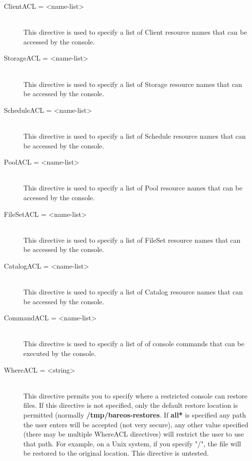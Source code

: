 \begin{description}
\item [ClientACL = {\textless}name-list{\textgreater}] \hfill \\
This directive is used to  specify a list of Client resource names that can
be
accessed by  the console.

\item [StorageACL = {\textless}name-list{\textgreater}] \hfill \\
This directive is used to  specify a list of Storage resource names that can
be accessed by  the console.

\item [ScheduleACL = {\textless}name-list{\textgreater}] \hfill \\
This directive is used to  specify a list of Schedule resource names that can
be accessed by the console.

\item [PoolACL = {\textless}name-list{\textgreater}] \hfill \\
This directive is used to  specify a list of Pool resource names that can be
accessed by the console.

\item [FileSetACL = {\textless}name-list{\textgreater}] \hfill \\
This directive is used to specify a list of FileSet resource names that
can be accessed by the console.

\item [CatalogACL = {\textless}name-list{\textgreater}] \hfill \\
This directive is used to specify a list of Catalog resource names that
can be accessed by the console.

\item [CommandACL = {\textless}name-list{\textgreater}] \hfill \\
This directive is used to specify a list of of console commands that can
be executed by the console.

\item [WhereACL = {\textless}string{\textgreater}] \hfill \\
This directive permits you to specify where a restricted console
can restore files. If this directive is not specified, only the
default restore location is permitted (normally {\bf
/tmp/bareos-restores}. If {\bf *all*} is specified any path the
user enters will be accepted (not very secure), any other
value specified (there may be multiple WhereACL directives) will
restrict the user to use that path. For example, on a Unix system,
if you specify "/", the file will be restored to the original
location.  This directive is untested.

\end{description}

